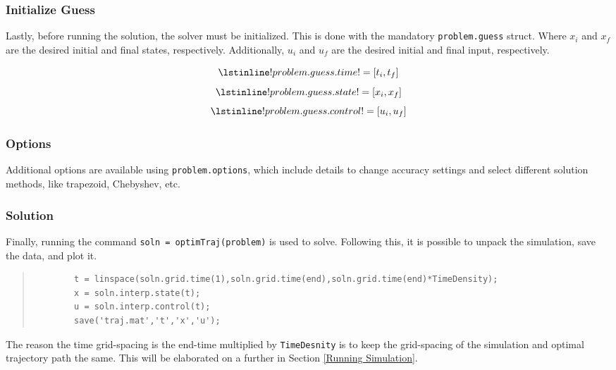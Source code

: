 \documentclass[12pt]{article}
\begin{document}
	\subsubsection{Initialize Guess}
	Lastly, before running the solution, the solver must be initialized. This is done with the mandatory \lstinline!problem.guess! struct. Where $x_{i}$ and $x_{f}$ are the desired initial and final states, respectively. Additionally, $u_{i}$ and $u_{f}$ are the desired initial and final input, respectively. 
	
	\begin{figure}[H]
		\begin{equation*}
		\lstinline!problem.guess.time! = [t_{i}, t_{f}]
		\end{equation*}
		\begin{equation*}
		\lstinline!problem.guess.state! = [x_{i}, x_{f}]
		\end{equation*}
		\begin{equation*}
		\lstinline!problem.guess.control! = [u_{i}, u_{f}] 
		\end{equation*}
	\end{figure}
	\subsubsection{Options}
	Additional options are available using \lstinline!problem.options!, which include details to change accuracy settings and select different solution methods, like trapezoid, Chebyshev, etc.
	\subsubsection{Solution}
	Finally, running the command \lstinline!soln = optimTraj(problem)! is used to solve. Following this, it is possible to unpack the simulation, save the data, and plot it.
	\begin{quote}
		\begin{lstlisting}
		t = linspace(soln.grid.time(1),soln.grid.time(end),soln.grid.time(end)*TimeDensity);
		x = soln.interp.state(t);
		u = soln.interp.control(t);
		save('traj.mat','t','x','u');
		\end{lstlisting}
	\end{quote}
	
	The reason the time grid-spacing is the end-time multiplied by \lstinline!TimeDesnity! is to keep the grid-spacing of the simulation and optimal trajectory path the same. This will be elaborated on a further in Section \ref{Running Simulation}.
	
\end{document}
